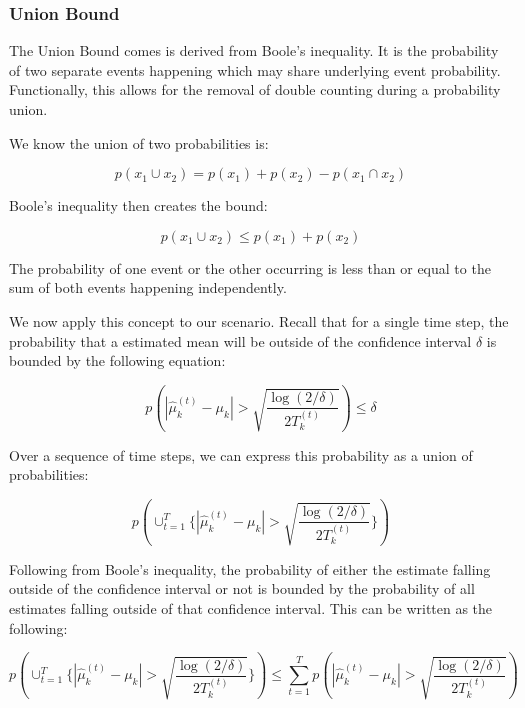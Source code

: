 \documentclass[11pt]{article}
\begin{document}
\subsubsection{Union Bound}

The Union Bound comes is derived from Boole's inequality. It is the probability of two separate events happening which may share underlying event probability. Functionally, this allows for the removal of double counting during a probability union.

We know the union of two probabilities is:

\begin{equation}
    p(x_1 \cup x_2) = p(x_1) + p(x_2) - p(x_1 \cap x_2)
\end{equation}

Boole's inequality then creates the bound:

\begin{equation}
    p(x_1 \cup x_2) \leq p(x_1) + p(x_2)
\end{equation}

The probability of one event or the other occurring is less than or equal to the sum of both events happening independently.

We now apply this concept to our scenario. Recall that for a single time step, the probability that a estimated mean will be outside of the confidence interval $\delta$ is bounded by the following equation:

\begin{equation}
    p(|\hat{\mu}_k^{(t)} - \mu_k| > \sqrt{\frac{\log(2/\delta)}{2T_k^{(t)}}}) \leq \delta
\end{equation}

Over a sequence of time steps, we can express this probability as a union of probabilities:

\begin{equation}
    p(\cup_{t=1}^T \{ |\hat{\mu}_k^{(t)} - \mu_k| > \sqrt{\frac{\log(2/\delta)}{2T_k^{(t)}}} \} )
\end{equation}

Following from Boole's inequality, the probability of either the estimate falling outside of the confidence interval or not is bounded by the probability of all estimates falling outside of that confidence interval. This can be written as the following:

\begin{equation}
     p(\cup_{t=1}^T \{ |\hat{\mu}_k^{(t)} - \mu_k| > \sqrt{\frac{\log(2/\delta)}{2T_k^{(t)}}} \} ) \leq \sum_{t=1}^T p(|\hat{\mu}_k^{(t)} - \mu_k| > \sqrt{\frac{\log(2/\delta)}{2T_k^{(t)}}})
\end{equation}
\end{document}

